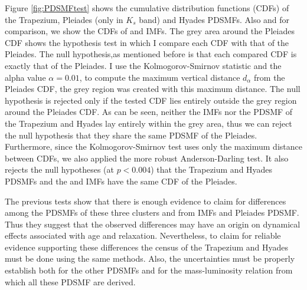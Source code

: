 Figure \ref{fig:PDSMFtest} shows the cumulative distribution functions (CDFs) of the Trapezium, Pleiades (only in $K_s$ band) and Hyades PDSMFs. Also and for comparison, we show the CDFs of \citet{Chabrier2005} and \citet{Thies2007} IMFs. The grey area around the Pleiades CDF shows the hypothesis test in which I compare each CDF with that of the Pleiades. The null hypothesis,as mentioned before is that each compared CDF is exactly that of the Pleiades. I use the Kolmogorov-Smirnov statistic and the alpha value $\alpha = 0.01$, to compute the maximum vertical distance $d_{\alpha}$ from the Pleiades CDF, the grey region was created with this maximum distance. The null hypothesis is rejected only if the tested CDF lies entirely outside the grey region around the Pleiades CDF. As can be seen, neither the IMFs nor the PDSMF of the Trapezium and Hyades lay entirely within the grey area, thus we can reject the null hypothesis that they share the same PDSMF of the Pleiades. Furthermore, since the Kolmogorov-Smirnov test uses only the maximum distance between CDFs, we also applied the more robust Anderson-Darling test. It also rejects the null hypotheses (at $p < 0.004$) that the Trapezium and Hyades PDSMFs and the \citet{Chabrier2005} and \citet{Thies2007} IMFs have the same CDF of the Pleiades. 

The previous tests show that there is enough evidence to claim for differences among the PDSMFs of these three clusters and from IMFs and Pleiades PDSMF. Thus they suggest that the observed differences may have an origin on dynamical effects associated with age and relaxation. Nevertheless, to claim for reliable evidence supporting these differences the census of the Trapezium and Hyades must be done using the same methods. Also, the uncertainties must be properly establish both for the other PDSMFs and for the mass-luminosity relation from which all these PDSMF are derived. 




